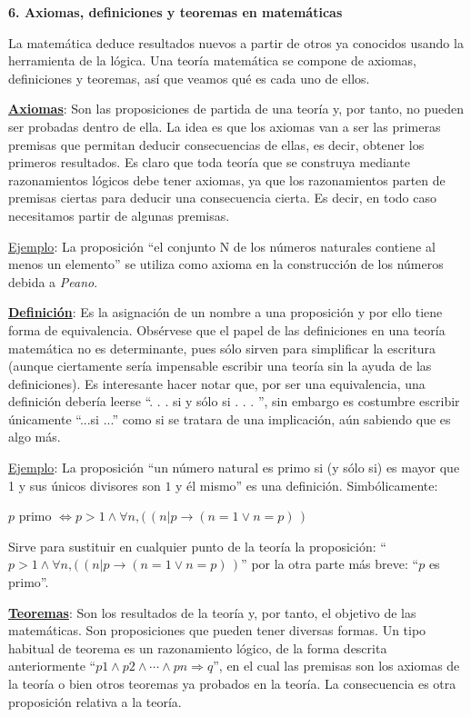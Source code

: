 \vspace{5mm}\textbf{6. Axiomas, definiciones y teoremas en matemáticas}

La matemática deduce resultados nuevos a partir de otros ya conocidos usando la herramienta de la lógica. Una teoría matemática se compone de axiomas, definiciones y teoremas, así que veamos qué es cada uno de ellos.

\underline{\textbf{Axiomas}}: Son las proposiciones de partida de una teoría y, por tanto, no pueden ser probadas dentro de ella. La idea es que los axiomas van a ser las primeras premisas que permitan deducir consecuencias de ellas, es decir, obtener los primeros resultados. Es claro que toda teoría que se construya mediante razonamientos lógicos debe tener axiomas, ya que los razonamientos parten de premisas ciertas para deducir una consecuencia cierta. Es decir, en todo caso necesitamos partir de algunas premisas.

\underline{Ejemplo}: La proposición “el conjunto N de los números naturales contiene al menos un elemento” se utiliza como axioma en la construcción de los números debida a \emph{Peano}.

\underline{\textbf{Definición}}: Es la asignación de un nombre a una proposición y por ello tiene forma de equivalencia. Obsérvese que el papel de las definiciones en una teoría matemática no es determinante, pues sólo sirven para simplificar la escritura (aunque ciertamente sería impensable escribir una teoría sin la ayuda de las definiciones). Es interesante hacer notar que, por ser una equivalencia, una definición debería leerse “. . . si y sólo si . . . ”, sin embargo es costumbre escribir únicamente “...si ...” como si se tratara de una implicación, aún sabiendo que es algo más.

\underline{Ejemplo}: La proposición “un número natural es primo si (y sólo si) es mayor que 1 y sus únicos divisores son $1$ y él mismo” es una definición. Simbólicamente: 

\hspace{2cm} $p$ primo $\Leftrightarrow p>1 \wedge  \forall n , (\,(n|p \to (n=1 \vee n=p)\, )$

Sirve para sustituir en cualquier punto de la teoría la proposición: 
``$p>1 \wedge  \forall n , (\,(n|p \to (n=1 \vee n=p)\, )$'' 
por la otra parte más breve: ``$p$ es primo''.

\underline{\textbf{Teoremas}}: Son los resultados de la teoría y, por tanto, el objetivo de las matemáticas. Son proposiciones que pueden tener diversas formas. Un tipo habitual de teorema es un razonamiento lógico, de la forma descrita anteriormente ``$ p1 \wedge p2 \wedge \cdots \wedge pn \Rightarrow  q$'', en el cual las premisas son los axiomas de la teoría o bien otros teoremas ya probados en la teoría. La consecuencia es otra proposición relativa a la teoría.

